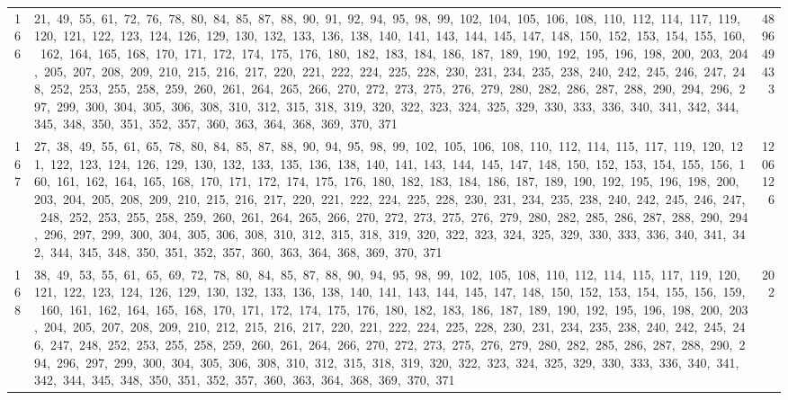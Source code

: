 \begin{longtable}{c|p{}|r}
166 & 21,\ 49,\ 55,\ 61,\ 72,\ 76,\ 78,\ 80,\ 84,\ 85,\ 87,\ 88,\ 90,\ 91,\ 92,\ 94,\ 95,\ 98,\ 99,\ 102,\ 104,\ 105,\ 106,\ 108,\ 110,\ 112,\ 114,\ 117,\ 119,\ 120,\ 121,\ 122,\ 123,\ 124,\ 126,\ 129,\ 130,\ 132,\ 133,\ 136,\ 138,\ 140,\ 141,\ 143,\ 144,\ 145,\ 147,\ 148,\ 150,\ 152,\ 153,\ 154,\ 155,\ 160,\ 162,\ 164,\ 165,\ 168,\ 170,\ 171,\ 172,\ 174,\ 175,\ 176,\ 180,\ 182,\ 183,\ 184,\ 186,\ 187,\ 189,\ 190,\ 192,\ 195,\ 196,\ 198,\ 200,\ 203,\ 204,\ 205,\ 207,\ 208,\ 209,\ 210,\ 215,\ 216,\ 217,\ 220,\ 221,\ 222,\ 224,\ 225,\ 228,\ 230,\ 231,\ 234,\ 235,\ 238,\ 240,\ 242,\ 245,\ 246,\ 247,\ 248,\ 252,\ 253,\ 255,\ 258,\ 259,\ 260,\ 261,\ 264,\ 265,\ 266,\ 270,\ 272,\ 273,\ 275,\ 276,\ 279,\ 280,\ 282,\ 286,\ 287,\ 288,\ 290,\ 294,\ 296,\ 297,\ 299,\ 300,\ 304,\ 305,\ 306,\ 308,\ 310,\ 312,\ 315,\ 318,\ 319,\ 320,\ 322,\ 323,\ 324,\ 325,\ 329,\ 330,\ 333,\ 336,\ 340,\ 341,\ 342,\ 344,\ 345,\ 348,\ 350,\ 351,\ 352,\ 357,\ 360,\ 363,\ 364,\ 368,\ 369,\ 370,\ 371 & 489649433 \\
167 & 27,\ 38,\ 49,\ 55,\ 61,\ 65,\ 78,\ 80,\ 84,\ 85,\ 87,\ 88,\ 90,\ 94,\ 95,\ 98,\ 99,\ 102,\ 105,\ 106,\ 108,\ 110,\ 112,\ 114,\ 115,\ 117,\ 119,\ 120,\ 121,\ 122,\ 123,\ 124,\ 126,\ 129,\ 130,\ 132,\ 133,\ 135,\ 136,\ 138,\ 140,\ 141,\ 143,\ 144,\ 145,\ 147,\ 148,\ 150,\ 152,\ 153,\ 154,\ 155,\ 156,\ 160,\ 161,\ 162,\ 164,\ 165,\ 168,\ 170,\ 171,\ 172,\ 174,\ 175,\ 176,\ 180,\ 182,\ 183,\ 184,\ 186,\ 187,\ 189,\ 190,\ 192,\ 195,\ 196,\ 198,\ 200,\ 203,\ 204,\ 205,\ 208,\ 209,\ 210,\ 215,\ 216,\ 217,\ 220,\ 221,\ 222,\ 224,\ 225,\ 228,\ 230,\ 231,\ 234,\ 235,\ 238,\ 240,\ 242,\ 245,\ 246,\ 247,\ 248,\ 252,\ 253,\ 255,\ 258,\ 259,\ 260,\ 261,\ 264,\ 265,\ 266,\ 270,\ 272,\ 273,\ 275,\ 276,\ 279,\ 280,\ 282,\ 285,\ 286,\ 287,\ 288,\ 290,\ 294,\ 296,\ 297,\ 299,\ 300,\ 304,\ 305,\ 306,\ 308,\ 310,\ 312,\ 315,\ 318,\ 319,\ 320,\ 322,\ 323,\ 324,\ 325,\ 329,\ 330,\ 333,\ 336,\ 340,\ 341,\ 342,\ 344,\ 345,\ 348,\ 350,\ 351,\ 352,\ 357,\ 360,\ 363,\ 364,\ 368,\ 369,\ 370,\ 371 & 1206126 \\
168 & 38,\ 49,\ 53,\ 55,\ 61,\ 65,\ 69,\ 72,\ 78,\ 80,\ 84,\ 85,\ 87,\ 88,\ 90,\ 94,\ 95,\ 98,\ 99,\ 102,\ 105,\ 108,\ 110,\ 112,\ 114,\ 115,\ 117,\ 119,\ 120,\ 121,\ 122,\ 123,\ 124,\ 126,\ 129,\ 130,\ 132,\ 133,\ 136,\ 138,\ 140,\ 141,\ 143,\ 144,\ 145,\ 147,\ 148,\ 150,\ 152,\ 153,\ 154,\ 155,\ 156,\ 159,\ 160,\ 161,\ 162,\ 164,\ 165,\ 168,\ 170,\ 171,\ 172,\ 174,\ 175,\ 176,\ 180,\ 182,\ 183,\ 186,\ 187,\ 189,\ 190,\ 192,\ 195,\ 196,\ 198,\ 200,\ 203,\ 204,\ 205,\ 207,\ 208,\ 209,\ 210,\ 212,\ 215,\ 216,\ 217,\ 220,\ 221,\ 222,\ 224,\ 225,\ 228,\ 230,\ 231,\ 234,\ 235,\ 238,\ 240,\ 242,\ 245,\ 246,\ 247,\ 248,\ 252,\ 253,\ 255,\ 258,\ 259,\ 260,\ 261,\ 264,\ 266,\ 270,\ 272,\ 273,\ 275,\ 276,\ 279,\ 280,\ 282,\ 285,\ 286,\ 287,\ 288,\ 290,\ 294,\ 296,\ 297,\ 299,\ 300,\ 304,\ 305,\ 306,\ 308,\ 310,\ 312,\ 315,\ 318,\ 319,\ 320,\ 322,\ 323,\ 324,\ 325,\ 329,\ 330,\ 333,\ 336,\ 340,\ 341,\ 342,\ 344,\ 345,\ 348,\ 350,\ 351,\ 352,\ 357,\ 360,\ 363,\ 364,\ 368,\ 369,\ 370,\ 371 & 202 \\

\end{longtable}
